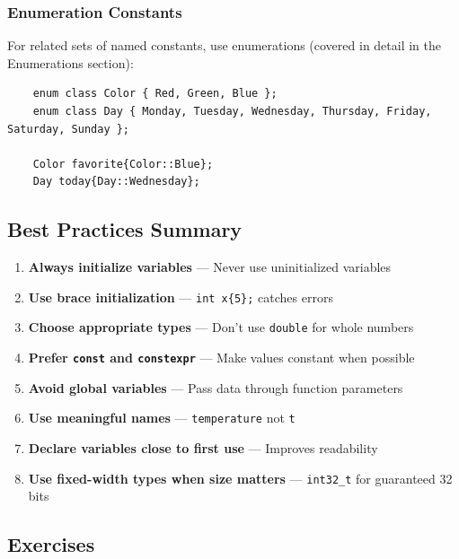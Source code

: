 \subsubsection{Enumeration Constants}

For related sets of named constants, use enumerations (covered in detail in the Enumerations section):

\begin{lstlisting}
	enum class Color { Red, Green, Blue };
	enum class Day { Monday, Tuesday, Wednesday, Thursday, Friday, Saturday, Sunday };
	
	Color favorite{Color::Blue};
	Day today{Day::Wednesday};
\end{lstlisting}

\subsection{Best Practices Summary}

\begin{enumerate}
	\item \textbf{Always initialize variables} — Never use uninitialized variables
	
	\item \textbf{Use brace initialization} — \texttt{int x\{5\};} catches errors
	
	\item \textbf{Choose appropriate types} — Don't use \texttt{double} for whole numbers
	
	\item \textbf{Prefer \texttt{const} and \texttt{constexpr}} — Make values constant when possible
	
	\item \textbf{Avoid global variables} — Pass data through function parameters
	
	\item \textbf{Use meaningful names} — \texttt{temperature} not \texttt{t}
	
	\item \textbf{Declare variables close to first use} — Improves readability
	
	\item \textbf{Use fixed-width types when size matters} — \texttt{int32\_t} for guaranteed 32 bits
\end{enumerate}

\subsection{Exercises}

